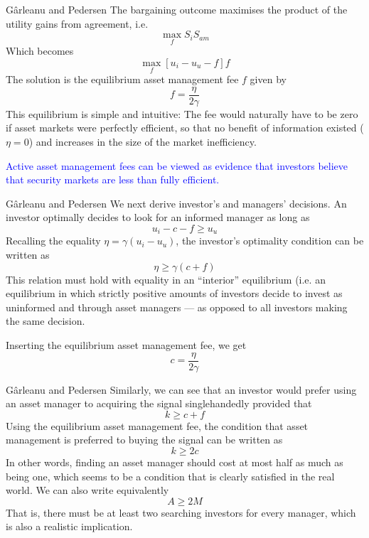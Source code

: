 \documentclass[aspectratio=169,xcolor=dvipsnames]{beamer}
\begin{document}
\begin{frame}{G\^arleanu and Pedersen}
    The bargaining outcome maximises the product of the utility gains from agreement, i.e.
    \[
        \max_f S_i S_{am}
    \]
    Which becomes
    \[
        \max_f [u_i - u_u - f] f
    \]
    The solution is the equilibrium asset management fee $f$ given by
    \[
        f = \frac{\eta}{2\gamma}
    \]
    This equilibrium is simple and intuitive: The fee would naturally have to be zero if asset markets were perfectly efficient, so that no benefit of information existed ($\eta = 0$) and increases in the size of the market inefficiency.

    \textcolor{blue}{Active asset management fees can be viewed as evidence that investors believe that security markets are less than fully efficient.}
\end{frame}

\begin{frame}{G\^arleanu and Pedersen}
    We next derive investor's and managers' decisions. An investor optimally decides to look for an informed manager as long as
    \[
        u_i - c - f \ge u_u
    \]
    Recalling the equality $\eta = \gamma (u_i - u_u)$, the investor's optimality condition can be written as
    \[
        \eta \ge \gamma (c + f)
    \]
    This relation must hold with equality in an ``interior'' equilibrium (i.e. an equilibrium in which strictly positive amounts of investors decide to invest as uninformed and through asset managers --- as opposed to all investors making the same decision.

    Inserting the equilibrium asset management fee, we get
    \[
        c = \frac{\eta}{2 \gamma}
    \]
\end{frame}

\begin{frame}{G\^arleanu and Pedersen}
    Similarly, we can see that an investor would prefer using an asset manager to acquiring the signal singlehandedly provided that
    \[
        k \ge c + f
    \]
    Using the equilibrium asset management fee, the condition that asset management is preferred to buying the signal can be written as
    \[
        k \ge 2c
    \]
    In other words, finding an asset manager should cost at most half as much as being one, which seems to be a condition that is clearly satisfied in the real world. We can also write equivalently
    \[
        A \ge 2M
    \]
    That is, there must be at least two searching investors for every manager, which is also a realistic implication.
\end{frame}
\end{document}
